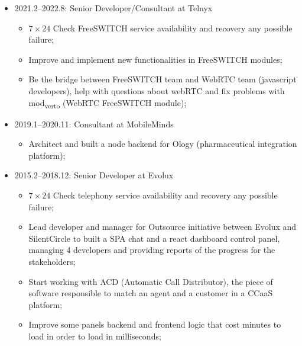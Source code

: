 \documentclass[
]{article}
\providecommand{\tightlist}{%
  \setlength{\itemsep}{0pt}\setlength{\parskip}{0pt}}
\begin{document}
\vspace{2mm}

\begin{itemize}
\tightlist
\item
  2021.2--2022.8: Senior Developer/Consultant at Telnyx

  \begin{itemize}
  \tightlist
  \item
    \(7 \times 24\) Check FreeSWITCH service availability and recovery
    any possible failure;
  \item
    Improve and implement new functionalities in FreeSWITCH modules;
  \item
    Be the bridge between FreeSWITCH team and WebRTC team (javascript
    developers), help with questions about webRTC and fix problems with
    mod\textsubscript{verto} (WebRTC FreeSWITCH module);
  \end{itemize}
\end{itemize}

\vspace{2mm}

\begin{itemize}
\tightlist
\item
  2019.1--2020.11: Consultant at MobileMinds

  \begin{itemize}
  \tightlist
  \item
    Architect and built a node backend for Ology (pharmaceutical
    integration platform);
  \end{itemize}
\end{itemize}

\vspace{2mm}

\begin{itemize}
\tightlist
\item
  2015.2--2018.12: Senior Developer at Evolux

  \begin{itemize}
  \tightlist
  \item
    \(7 \times 24\) Check telephony service availability and recovery
    any possible failure;
  \item
    Lead developer and manager for Outsource initiative between Evolux
    and SilentCircle to built a SPA chat and a react dashboard control
    panel, managing 4 developers and providing reports of the progress
    for the stakeholders;
  \item
    Start working with ACD (Automatic Call Distributor), the piece of
    software responsible to match an agent and a customer in a CCaaS
    platform;
  \item
    Improve some panels backend and frontend logic that cost minutes to
    load in order to load in milliseconds;
  \end{itemize}
\end{itemize}
\end{document}
